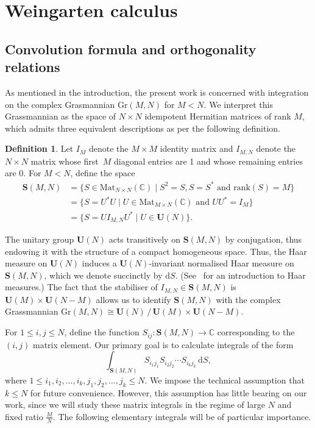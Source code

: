 \documentclass[a4paper]{article}
\theoremstyle{plain}
\numberwithin{theorem}{section}
\theoremstyle{definition}
\newtheorem{definition}[theorem]{Definition}
\theoremstyle{remark}
\newcommand{\dd}{\mathrm{d}}
\renewcommand{\leq}{\leqslant}
\newcommand{\UM}{\mathbf{U}}			%
\newcommand{\SM}{\mathbf{S}}			%
\begin{document}
\section{Weingarten calculus} \label{sec:weingarten}

\subsection{Convolution formula and orthogonality relations}

As mentioned in the introduction, the present work is concerned with integration on the complex Grasmannian $\mathrm{Gr}(M,N)$ for $M < N$. We interpret this Grassmannian as the space of $N \times N$ idempotent Hermitian matrices of rank $M$, which admits three equivalent descriptions as per the following definition.


\begin{definition}
Let $I_M$ denote the $M \times M$ identity matrix and $I_{M,N}$ denote the $N \times N$ matrix whose first~$M$ diagonal entries are 1 and whose remaining entries are 0. For $M < N$, define the space
\begin{align*}
\SM(M,N) &= \{ S \in \mathrm{Mat}_{N \times N}(\mathbb{C}) \mid S^2 = S, S = S^* \text{ and } \mathrm{rank}(S) = M \} \\
&= \{ S = U^*U \mid U \in \mathrm{Mat}_{M \times N}(\mathbb{C}) \text{ and } UU^* = I_M \} \\
&= \{ S = U I_{M,N} U^* \mid U \in \UM(N) \}.
\end{align*}
\end{definition}


The unitary group $\UM(N)$ acts transitively on $\SM(M,N)$ by conjugation, thus endowing it with the structure of a compact homogeneous space. Thus, the Haar measure on $\UM(N)$ induces a $\UM(N)$-invariant normalised Haar measure on $\SM(M,N)$, which we denote succinctly by $\dd S$. (See~\cite{die-spa14} for an introduction to Haar measures.) The fact that the stabiliser of $I_{M,N} \in \SM(M,N)$ is $\UM(M) \times \UM(N-M)$ allows us to identify $\SM(M,N)$ with the complex Grassmannian $\mathrm{Gr}(M,N) \cong \UM(N) \, / \, \UM(M) \times \UM(N-M)$. 


For $1 \leq i, j \leq N$, define the function $S_{ij}: \SM(M,N) \to \mathbb{C}$ corresponding to the $(i,j)$ matrix element. Our primary goal is to calculate integrals of the form
\[
\int_{\SM(M,N)} S_{i_1 j_1} S_{i_2 j_2} \cdots S_{i_k j_k} \, \dd S,
\]
where $1 \leq i_1, i_2, \ldots, i_k, j_1, j_2, \ldots, j_k \leq N$. We impose the technical assumption that $k \leq N$ for future convenience. However, this assumption has little bearing on our work, since we will study these matrix integrals in the regime of large $N$ and fixed ratio $\frac{M}{N}$. The following elementary integrals will be of particular importance.
\end{document}
